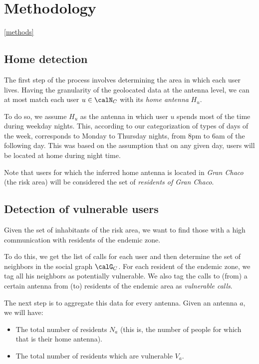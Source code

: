 
\section{Methodology} \ref{methods}

\subsection{Home detection}

    The first step of the process involves determining the area in which each user lives. Having the granularity of the geolocated data at the antenna level, we can at most match each user $u \in \calN_C$ with its \textit{home antenna} $H_u$.

    To do so, we assume $H_u$ as the antenna in which user $u$ spends most of the time during weekday nights. This, according to our categorization of types of days of the week, corresponds to Monday to Thursday nights, from 8pm to 6am of the following day. This was based on the assumption that on any given day, users will be located at home during night time.
    
    Note that users for which the inferred home antenna is located in \textit{Gran Chaco} (the risk area) will be considered the set of \textit{residents of Gran Chaco}.

\subsection{Detection of vulnerable users}
    Given the set of inhabitants of the risk area, we want to find those with a high communication with residents of the endemic zone.
    
    To do this, we get the list of calls for each user and then determine the set of neighbors in the social graph $\calG_C$. For each resident of the endemic zone, we tag all his neighbors as potentially vulnerable. We also tag the calls to (from) a certain antenna from (to) residents of the endemic area as \textit{vulnerable calls}.
    
    The next step is to aggregate this data for every antenna. Given an antenna $a$, we will have:
    \begin{itemize}
        \item The total number of residents $N_a$ (this is, the number of people for which that is their home antenna).
        \item The total number of residents which are vulnerable $V_a$.
    \end{itemize}
    
